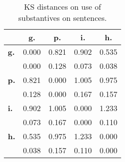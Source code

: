 \begin{table}[h!]
\begin{center}
\begin{tabular}{| l || c | c | c | c |}\hline
 & {\bf g.} & {\bf p.} & {\bf i.} & {\bf h.} \\\hline\hline
{\bf g.} & 0.000 & 0.821 & 0.902 & 0.535 \\
{\bf } & 0.000 & 0.128 & 0.073 & 0.038 \\\hline
{\bf p.} & 0.821 & 0.000 & 1.005 & 0.975 \\
{\bf } & 0.128 & 0.000 & 0.167 & 0.157 \\\hline
{\bf i.} & 0.902 & 1.005 & 0.000 & 1.233 \\
{\bf } & 0.073 & 0.167 & 0.000 & 0.110 \\\hline
{\bf h.} & 0.535 & 0.975 & 1.233 & 0.000 \\
{\bf } & 0.038 & 0.157 & 0.110 & 0.000 \\\hline
\end{tabular}
\caption{KS distances on use of substantives on sentences.}
\end{center}
\end{table}